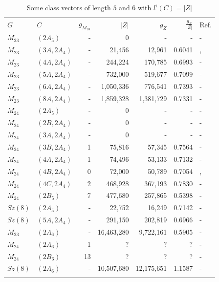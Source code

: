 \documentclass[12pt,a4paper]{article}
\numberwithin{equation}{section}
\numberwithin{table}{section}
\begin{document}
\begin{table}[H]
\centering
\footnotesize
\captionsetup{font=footnotesize}
\caption{Some class vectors of length $5$ and $6$ with $l^i(C) = \vert Z \vert$}
\label{tab:Data_56DimClassvectors}
\begin{tabular}{llrrrrl}
\hline\noalign{\smallskip}
$G$ & $C$ & $g_{M_{23}}$ & $ \vert Z \vert $ & $g_Z$ & $\frac{g_Z}{\vert Z \vert}$ & Ref.\\
\noalign{\smallskip}\hline\noalign{\smallskip}
$M_{23}$ & $(2A_5)$ & - & 0 & - & - & -\\
$M_{23}$ & $(3A,2A_4)$ & - & 21,456 & 12,961 & 0.6041 & \cite{RefKoe2014}, \cite{RefMag2003}\\
$M_{23}$ & $(4A,2A_4)$ & - & 244,224 & 170,785 & 0.6993 & -\\
$M_{23}$ & $(5A,2A_4)$ & - & 732,000 & 519,677 & 0.7099 & -\\
$M_{23}$ & $(6A,2A_4)$ & - & 1,050,336 & 776,541 & 0.7393 & -\\
$M_{23}$ & $(8A,2A_4)$ & - & 1,859,328 & 1,381,729 & 0.7331 & -\\
\noalign{\smallskip}\hline\noalign{\smallskip}
$M_{24}$ & $(2A_5)$ & - & 0 & - & - & -\\
$M_{24}$ & $(2B,2A_4)$ & - & 0 & - & - & -\\
$M_{24}$ & $(3A,2A_4)$ & - & 0 & - & - & -\\
$M_{24}$ & $(3B,2A_4)$ & 1 & 75,816 & 57,345 & 0.7564 & -\\
$M_{24}$ & $(4A,2A_4)$ & 1 & 74,496 & 53,133 & 0.7132 & -\\
$M_{24}$ & $(4B,2A_4)$ & 0 & 72,000 & 50,789 & 0.7054 & \cite{RefKoe2014}, \cite{RefMag2003}\\
$M_{24}$ & $(4C,2A_4)$ & 2 & 468,928 & 367,193 & 0.7830 & -\\
$M_{24}$ & $(2B_5)$ & 7 & 477,680 & 257,865 & 0.5398 & -\\
\noalign{\smallskip}\hline\noalign{\smallskip}
$Sz(8)$ & $(2A_5)$ & - & 22,752 & 16,249 & 0.7142 & -\\
$Sz(8)$ & $(5A,2A_4)$ & - & 291,150 & 202,819 & 0.6966 & -\\
\noalign{\smallskip}\hline\noalign{\smallskip}
$M_{23}$ & $(2A_6)$ & - & 16,463,280 & 9,722,161 & 0.5905 & -\\
\noalign{\smallskip}\hline\noalign{\smallskip}
$M_{24}$ & $(2A_6)$ & 1 & ? & ? & ? & -\\
$M_{24}$ & $(2B_6)$ & 13 & ? & ? & ? & -\\
\noalign{\smallskip}\hline\noalign{\smallskip}
$Sz(8)$ & $(2A_6)$ & - & 10,507,680 & 12,175,651 & 1.1587 & -\\
\noalign{\smallskip}\hline
\end{tabular}
\end{table}
\end{document}
